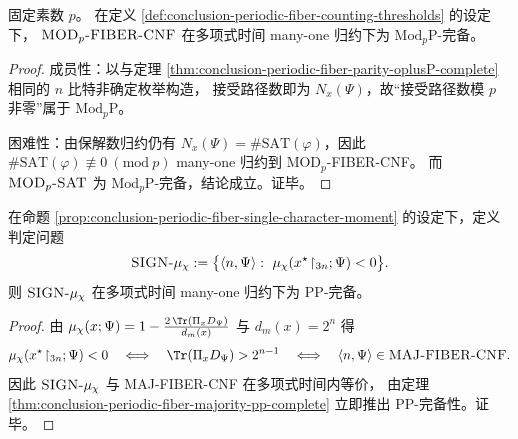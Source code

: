 \begin{theorem}\label{thm:conclusion-periodic-fiber-modp-modpP-complete}
固定素数 \(p\)。
在定义 \ref{def:conclusion-periodic-fiber-counting-thresholds} 的设定下，
\(\text{\normalfont\textsc{MOD}}_p\text{\normalfont\textsc{-FIBER-CNF}}\) 在多项式时间 many-one 归约下为 \(\mathrm{Mod}_p\mathrm{P}\)-完备。
\end{theorem}
\begin{proof}
成员性：以与定理 \ref{thm:conclusion-periodic-fiber-parity-oplusP-complete} 相同的 \(n\) 比特非确定枚举构造，
接受路径数即为 \(N_x(\Psi)\)，故“接受路径数模 \(p\) 非零”属于 \(\mathrm{Mod}_p\mathrm{P}\)。
\par
困难性：由保解数归约仍有 \(N_x(\Psi)=\#\mathrm{SAT}(\varphi)\)，因此 \(\#\mathrm{SAT}(\varphi)\not\equiv 0\ (\mathrm{mod}\ p)\) many-one 归约到 \textsc{MOD}\(_p\)\textsc{-FIBER-CNF}。
而 \(\textsc{MOD}_p\textsc{-SAT}\) 为 \(\mathrm{Mod}_p\mathrm{P}\)-完备，结论成立。证毕。
\end{proof}

\begin{proposition}\label{prop:conclusion-periodic-fiber-sign-muchi-pp-complete}
在命题 \ref{prop:conclusion-periodic-fiber-single-character-moment} 的设定下，定义判定问题
\[
\text{\normalfont\textsc{SIGN-}}\mu_\chi
:=
\bigl\{\langle n,\Psi\rangle:\ \mu_\chi(x^\star\!\upharpoonright_{3n};\Psi)<0\bigr\}.
\]
则 \(\text{\normalfont\textsc{SIGN-}}\mu_\chi\) 在多项式时间 many-one 归约下为 \(\mathrm{PP}\)-完备。
\end{proposition}
\begin{proof}
由 \(\mu_\chi(x;\Psi)=1-\frac{2\,\Tr(\Pi_xD_\Psi)}{d_m(x)}\) 与 \(d_m(x)=2^n\) 得
\[
\mu_\chi(x^\star\!\upharpoonright_{3n};\Psi)<0
\quad\Longleftrightarrow\quad
\Tr(\Pi_xD_\Psi)>2^{n-1}
\quad\Longleftrightarrow\quad
\langle n,\Psi\rangle\in \textsc{MAJ-FIBER-CNF}.
\]
因此 \(\textsc{SIGN-}\mu_\chi\) 与 \textsc{MAJ-FIBER-CNF} 在多项式时间内等价，
由定理 \ref{thm:conclusion-periodic-fiber-majority-pp-complete} 立即推出 \(\mathrm{PP}\)-完备性。证毕。
\end{proof}

